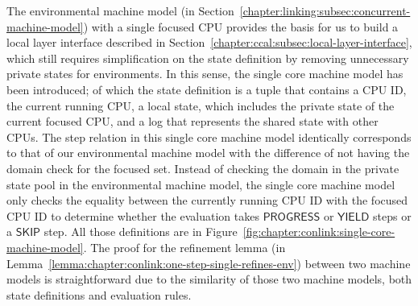 The environmental machine model 
(in Section~\ref{chapter:linking:subsec:concurrent-machine-model})
 with a single focused CPU provides the 
basis for us to build a local layer interface described in Section~\ref{chapter:ccal:subsec:local-layer-interface},
which still requires simplification on the state definition by 
removing unnecessary private states for environments. 
In this sense, the single core machine model has been introduced;
of which the state definition is a tuple that contains 
a CPU ID, the current running CPU, 
a local state, which includes the private state of the current focused CPU,
and a log that represents the shared state with other CPUs. 
The step relation in this single core machine model identically corresponds to that of our environmental machine model
with the difference of not having the domain check for the focused set. 
Instead of checking the domain in the private state pool in the environmental machine model, 
the single core machine model only checks the equality between the currently running CPU ID with the focused CPU ID to determine whether the evaluation takes $\textsf{PROGRESS}$ or $\textsf{YIELD}$ steps or a $\textsf{SKIP}$ step. 
All those definitions are in Figure~\ref{fig:chapter:conlink:single-core-machine-model}.
The proof for the refinement lemma (in Lemma~\ref{lemma:chapter:conlink:one-step-single-refines-env}) between two machine models is straightforward due to the similarity of those two machine models, both state definitions and evaluation rules. 

%
%


